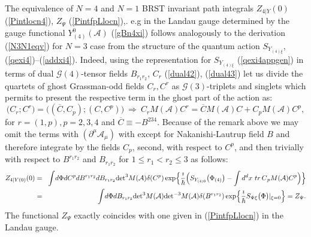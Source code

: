 \documentclass[10pt]{article}
\begin{document}
The equivalence of $N=4$ and $N=1$
 BRST invariant path integrals
 ${Z}_{4|Y}(0)$  (\ref{Pintlocn4}),  $
Z_\Psi $  (\ref{PintfpLlocn}),. e.g in the Landau gauge determined by the gauge functional $Y^0_{(4)}(\mathcal{A})$  (\ref{gBn4xi}) follows  analogously  to the derivation (\ref{N3N1eqv}) for $N=3$ case
from  the structure of the quantum action $S_{Y_{(4)\xi}}$,   (\ref{qexi4})--(\ref{addxi4}).  Indeed, using the representation for $S_{Y_{(4)\xi}}$  (\ref{qexi4appgen})  in terms of  dual  $\mathcal{G}(4)$-tensor fields  $B_{r_1r_2}$, $C_{r}$  (\ref{dual42}), (\ref{dual43})
let us divide  the quartets of ghost Grassman-odd  fields  $C_{r}, C^{r}$  as $\mathcal{G}(3)$-triplets and singlets which  permits to present the respective term in the ghost part of the action as:
 \begin{equation}\label{N4N31}
   \big(C_{r}; C^{r}\big) = \big((\overline{C},{C}_{p}); (C, C^{p})\big) \ \Rightarrow\  C_{r}M(\mathcal{A})  C^{r} = \overline{C}M(\mathcal{A})  C+ C_{p}M(\mathcal{A})  C^{p},
 \end{equation}
 for $r=(1,p), p=2,3,4$ and $\overline{C} \equiv -B^{234}$.  Because of the remark above we may omit the terms with $(\partial^\mu\mathcal{ A}_{\mu })$ with except for Nakanishi-Lautrup field $B$ and therefore integrate  by the fields $C_{p}$, second,   with respect to $C^{p}$, and then trivially  with respect  to $B^{r_1r_2}$  and $B_{r_1r_2}$ for $1\leq r_1<r_2 \leq 3$
 as follows:
\begin{eqnarray}%
  {Z}_{4|Y(0)}(0) &=& \hspace{-0.15em}\int \hspace{-0.15em}  d {\Phi}d {C^p} dB^{r_1r_2}  dB_{r_1r_2} {\det}^{3} M(\mathcal{A})  \delta(C^p) \exp \hspace{-0.15em}\Big\{\frac{\imath}{\hbar}\Big(S_{Y_{(4)0}}\big({\Phi}_{(4)} \big) - \int d^{d}x\ tr\, {C}{}_{p}M(\mathcal{A}) {C}{}^{p}  \Big)\Big\} \nonumber \\
   & =&   \hspace{-0.15em}\int \hspace{-0.15em}  d {\Phi} dB_{r_1r_2}  {\det}^{3} M(\mathcal{A}) {\det}^{-3} M(\mathcal{A})  \delta(B^{r_1r_2})  \exp \hspace{-0.15em}\Big\{\frac{\imath}{\hbar}S_{\Psi{\xi}}\big({\Phi} \big )\vert_{\xi=0} \Big\} = {Z}_{\Psi}.\label{N4N1eqv}
\end{eqnarray}
The functional ${Z}_{\Psi}$ exactly coincides with one given in (\ref{PintfpLlocn}) in the Landau gauge.
\end{document}
